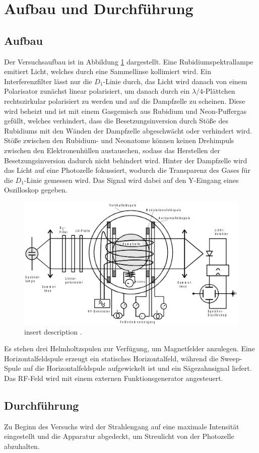 \section{Aufbau und Durchführung}
\label{sec:Durchführung}

  \subsection{Aufbau}

  Der Versuchsaufbau ist in Abbildung \ref{fig:aufbau} dargestellt.
  Eine Rubidiumspektrallampe emitiert Licht, welches durch eine Sammellinse kollimiert wird.
  Ein Interferenzfilter lässt nur die $D_1$-Linie durch, das Licht wird danach von einem Polarisator zunächst linear polarisiert, um danach durch ein $\lambda/4$-Plättchen rechtszirkular polarisiert zu werden und auf die Dampfzelle zu scheinen. Diese wird beheizt und ist mit einem Gasgemisch aus Rubidium und Neon-Puffergas gefüllt, welches verhindert, dass die Besetzungsinversion durch Stöße des Rubidiums mit den Wänden der Dampfzelle abgeschwächt oder verhindert wird. Stöße zwischen den Rubidium- und Neonatome können keinen Drehimpuls zwischen den Elektronenhüllen austauschen, sodass das Herstellen der Besetzungsinversion dadurch nicht behindert wird. Hinter der Dampfzelle wird das Licht auf eine Photozelle fokussiert, wodurch die Transparenz des Gases für die $D_1$-Linie gemessen wird. Das Signal wird dabei auf den Y-Eingang eines Oszilloskop gegeben.

  \begin{figure}
    \centering
    \includegraphics[width=\textwidth]{pictures/aufbau.png}
    \caption{insert description \cite{stehendeWelle}.}
    \label{fig:aufbau}
  \end{figure}

  Es stehen drei Helmholtzspulen zur Verfügung, um Magnetfelder anzulegen. Eine Horizontalfeldspule erzeugt ein statisches Horizontalfeld, während die Sweep-Spule auf die Horizontalfeldspule aufgewickelt ist und ein Sägezahnsignal liefert. Das RF-Feld wird mit einem externen Funktionsgenerator angesteuert.

  \subsection{Durchführung}

  Zu Beginn des Versuchs wird der Strahlengang auf eine maximale Intensität eingestellt und die Apparatur abgedeckt, um Streulicht von der Photozelle abzuhalten. 

